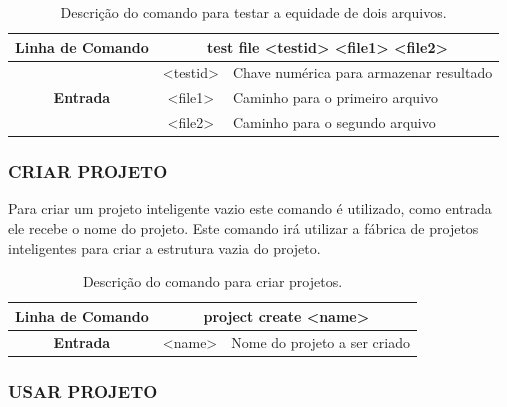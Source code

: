 \documentclass[a4paper,12pt]{monografia}
\theoremstyle{plain}
\theoremstyle{definition}
\theoremstyle{remark}
\begin{document}
\begin{center}
	\begin{table}[!htbp]
	\begin{tabular}{|c|c|m{}|}
		\hline
		\textbf{Linha de Comando} & \multicolumn{2}{c|}{test file <test\underline{\space\space}id> <file1> <file2>} \\
		\hline
		\multirow{3}{*}{\textbf{Entrada}} & <test\underline{\space\space}id> & Chave numérica para armazenar resultado \\
		 & <file1> & Caminho para o primeiro arquivo \\
		 & <file2> & Caminho para o segundo arquivo \\
		\hline
	\end{tabular}
	\caption{Descrição do comando para testar a equidade de dois arquivos.}
	\label{tab:file_test}
	\end{table}
\end{center}

\subsubsection{CRIAR PROJETO}\label{sec:create_projects}

Para criar um projeto inteligente vazio este comando é utilizado, como entrada ele recebe o nome do projeto. Este comando irá utilizar a fábrica de projetos inteligentes para criar a estrutura vazia do projeto.

\begin{center}
\begin{table}[!htbp]
	\begin{tabular}{|c|c|m{}|}
		\hline
		\textbf{Linha de Comando} & \multicolumn{2}{c|}{project create <name>} \\
		\hline
		\textbf{Entrada} & <name> & Nome do projeto a ser criado \\
		\hline
	\end{tabular}
	\caption{Descrição do comando para criar projetos.}
	\label{tab:create_project}
\end{table}
\end{center}

\subsubsection{USAR PROJETO}\label{sec:use_projects}
\end{document}
